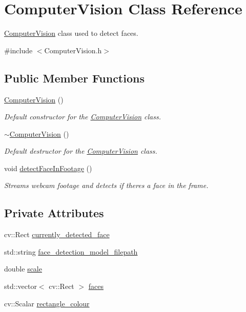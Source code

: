 \hypertarget{classComputerVision}{}\section{Computer\+Vision Class Reference}
\label{classComputerVision}


\hyperlink{classComputerVision}{Computer\+Vision} class used to detect faces.  




{\ttfamily \#include $<$Computer\+Vision.\+h$>$}

\subsection*{Public Member Functions}
\begin{DoxyCompactItemize}
\item 
\hyperlink{classComputerVision_a0cf41397e6a6a8769319250e4637ae9c}{Computer\+Vision} ()
\begin{DoxyCompactList}\small\item\em Default constructor for the \hyperlink{classComputerVision}{Computer\+Vision} class. \end{DoxyCompactList}\item 
\hyperlink{classComputerVision_ade7ffcea132abfa3c854b2de0fc73b86}{$\sim$\+Computer\+Vision} ()
\begin{DoxyCompactList}\small\item\em Default destructor for the \hyperlink{classComputerVision}{Computer\+Vision} class. \end{DoxyCompactList}\item 
void \hyperlink{classComputerVision_abe0c3d02170f802d0bea5934d359105f}{detect\+Face\+In\+Footage} ()
\begin{DoxyCompactList}\small\item\em Streams webcam footage and detects if theres a face in the frame. \end{DoxyCompactList}\end{DoxyCompactItemize}
\subsection*{Private Attributes}
\begin{DoxyCompactItemize}
\item 
cv\+::\+Rect \hyperlink{classComputerVision_aa3f9fbec2c764b3dd7e94f17cd2a31b2}{currently\+\_\+detected\+\_\+face}
\item 
std\+::string \hyperlink{classComputerVision_aa7fdd720db121a9cd89ed1dee5e9b227}{face\+\_\+detection\+\_\+model\+\_\+filepath}
\item 
double \hyperlink{classComputerVision_abf1765f5ca546b58b924b3c54f9703df}{scale}
\item 
std\+::vector$<$ cv\+::\+Rect $>$ \hyperlink{classComputerVision_aa64283da8be33e2187bab7f4bdf177aa}{faces}
\item 
cv\+::\+Scalar \hyperlink{classComputerVision_af85281318e654de22e153b4e77163f25}{rectangle\+\_\+colour}
\end{DoxyCompactItemize}


